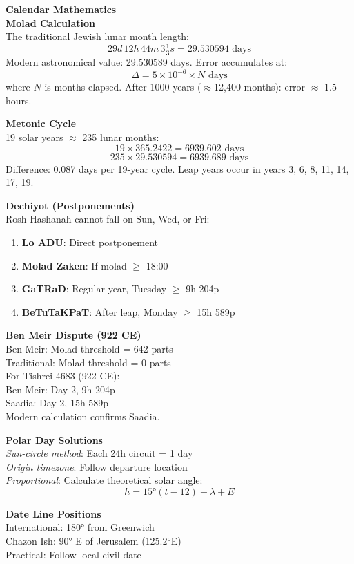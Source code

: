 \begin{technical}
{\Large\textbf{Calendar Mathematics}}\\[0.5em]

\textbf{Molad Calculation}\\[0.3em]
The traditional Jewish lunar month length:
\[
29d\,12h\,44m\,3\tfrac{1}{3}s = 29.530594\text{ days}
\]
Modern astronomical value: 29.530589 days. Error accumulates at:
\[
\Delta = 5 \times 10^{-6} \times N \text{ days}
\]
where $N$ is months elapsed. After 1000 years ($\approx$12,400 months): error $\approx$ 1.5 hours.

\textbf{Metonic Cycle}\\[0.3em]
19 solar years $\approx$ 235 lunar months:
\[
19 \times 365.2422 = 6939.602\text{ days}
\]
\[
235 \times 29.530594 = 6939.689\text{ days}
\]
Difference: 0.087 days per 19-year cycle. Leap years occur in years 3, 6, 8, 11, 14, 17, 19.

\textbf{Dechiyot (Postponements)}\\[0.3em]
Rosh Hashanah cannot fall on Sun, Wed, or Fri:
\begin{enumerate}[leftmargin=*,topsep=0pt,itemsep=0pt]
\item \textbf{Lo ADU}: Direct postponement
\item \textbf{Molad Zaken}: If molad $\geq$ 18:00
\item \textbf{GaTRaD}: Regular year, Tuesday $\geq$ 9h 204p
\item \textbf{BeTuTaKPaT}: After leap, Monday $\geq$ 15h 589p
\end{enumerate}

\textbf{Ben Meir Dispute (922 CE)}\\[0.3em]
Ben Meir: Molad threshold = 642 parts\\
Traditional: Molad threshold = 0 parts\\
For Tishrei 4683 (922 CE):\\
Ben Meir: Day 2, 9h 204p\\
Saadia: Day 2, 15h 589p\\
Modern calculation confirms Saadia.

\textbf{Polar Day Solutions}\\[0.3em]
\textit{Sun-circle method}: Each 24h circuit = 1 day\\
\textit{Origin timezone}: Follow departure location\\
\textit{Proportional}: Calculate theoretical solar angle:
\[
h = 15°(t-12) - \lambda + E
\]

\textbf{Date Line Positions}\\[0.3em]
International: 180° from Greenwich\\
Chazon Ish: 90° E of Jerusalem (125.2°E)\\
Practical: Follow local civil date\\


\end{technical}

